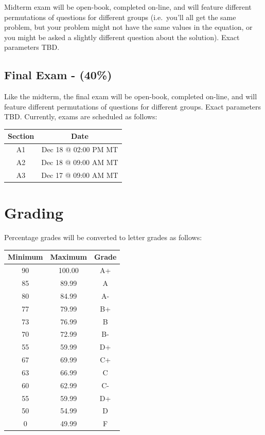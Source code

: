 \documentclass[11pt,]{article}
\begin{document}
Midterm exam will be open-book, completed on-line, and will feature
different permutations of questions for different groups (i.e.~you'll
all get the same problem, but your problem might not have the same
values in the equation, or you might be asked a slightly different
question about the solution). Exact parameters TBD.

\hypertarget{final-exam---40}{%
\subsection{Final Exam - (40\%)}\label{final-exam---40}}

Like the midterm, the final exam will be open-book, completed on-line,
and will feature different permutations of questions for different
groups. Exact parameters TBD. Currently, exams are scheduled as follows:

\begin{table}[H]
\centering
\begin{tabular}{cc}
\toprule
Section & Date\\
\midrule
A1 & Dec 18 @ 02:00 PM MT\\
A2 & Dec 18 @ 09:00 AM MT\\
A3 & Dec 17 @ 09:00 AM MT\\
\bottomrule
\end{tabular}
\end{table}

\hypertarget{grading}{%
\section{Grading}\label{grading}}

Percentage grades will be converted to letter grades as follows:

\begin{table}[H]
\centering
\begin{tabular}{ccc}
\toprule
Minimum & Maximum & Grade\\
\midrule
90 & 100.00 & A+\\
85 & 89.99 & A\\
80 & 84.99 & A-\\
77 & 79.99 & B+\\
73 & 76.99 & B\\
70 & 72.99 & B-\\
55 & 59.99 & D+\\
67 & 69.99 & C+\\
63 & 66.99 & C\\
60 & 62.99 & C-\\
55 & 59.99 & D+\\
50 & 54.99 & D\\
0 & 49.99 & F\\
\bottomrule
\end{tabular}
\end{table}
\end{document}
